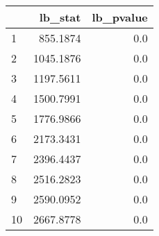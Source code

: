 \begin{tabular}{lrr}
\toprule
{} &    lb\_stat &  lb\_pvalue \\
\midrule
1  &   855.1874 &        0.0 \\
2  &  1045.1876 &        0.0 \\
3  &  1197.5611 &        0.0 \\
4  &  1500.7991 &        0.0 \\
5  &  1776.9866 &        0.0 \\
6  &  2173.3431 &        0.0 \\
7  &  2396.4437 &        0.0 \\
8  &  2516.2823 &        0.0 \\
9  &  2590.0952 &        0.0 \\
10 &  2667.8778 &        0.0 \\
\bottomrule
\end{tabular}

